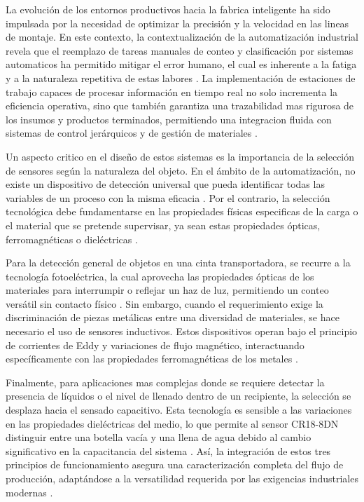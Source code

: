 \documentclass[conference]{IEEEtran}
\begin{document}
La evolución de los entornos productivos hacia la fabrica inteligente ha sido impulsada por la necesidad de optimizar la precisión y la velocidad en las lineas de montaje. En este contexto, la contextualización de la automatización industrial revela que el reemplazo de tareas manuales de conteo y clasificación por sistemas automaticos ha permitido mitigar el error humano, el cual es inherente a la fatiga y a la naturaleza repetitiva de estas labores \cite{sensores_1}. La implementación de estaciones de trabajo capaces de procesar información en tiempo real no solo incrementa la eficiencia operativa, sino que también garantiza una trazabilidad mas rigurosa de los insumos y productos terminados, permitiendo una integracion fluida con sistemas de control jerárquicos y de gestión de materiales \cite{sensores_2}.

Un aspecto critico en el diseño de estos sistemas es la importancia de la selección de sensores según la naturaleza del objeto. En el ámbito de la automatización, no existe un dispositivo de detección universal que pueda identificar todas las variables de un proceso con la misma eficacia \cite{sensores_11}. Por el contrario, la selección tecnológica debe fundamentarse en las propiedades físicas especificas de la carga o el material que se pretende supervisar, ya sean estas propiedades ópticas, ferromagnéticas o dieléctricas \cite{sensores_3}.

Para la detección general de objetos en una cinta transportadora, se recurre a la tecnología fotoeléctrica, la cual aprovecha las propiedades ópticas de los materiales para interrumpir o reflejar un haz de luz, permitiendo un conteo versátil sin contacto físico \cite{sensores_7, sensores_9}. Sin embargo, cuando el requerimiento exige la discriminación de piezas metálicas entre una diversidad de materiales, se hace necesario el uso de sensores inductivos. Estos dispositivos operan bajo el principio de corrientes de Eddy y variaciones de flujo magnético, interactuando específicamente con las propiedades ferromagnéticas de los metales \cite{sensores_4, sensores_19}.

Finalmente, para aplicaciones mas complejas donde se requiere detectar la presencia de líquidos o el nivel de llenado dentro de un recipiente, la selección se desplaza hacia el sensado capacitivo. Esta tecnología es sensible a las variaciones en las propiedades dieléctricas del medio, lo que permite al sensor CR18-8DN distinguir entre una botella vacía y una llena de agua debido al cambio significativo en la capacitancia del sistema \cite{sensores_16, sensores_18}. Así, la integración de estos tres principios de funcionamiento asegura una caracterización completa del flujo de producción, adaptándose a la versatilidad requerida por las exigencias industriales modernas \cite{sensores_14}.
\end{document}
